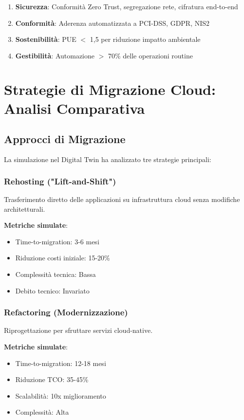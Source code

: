 \begin{enumerate}
\item \textbf{Sicurezza}: Conformità Zero Trust, segregazione rete, cifratura end-to-end
\item \textbf{Conformità}: Aderenza automatizzata a PCI-DSS, GDPR, NIS2
\item \textbf{Sostenibilità}: PUE $<$ 1,5 per riduzione impatto ambientale
\item \textbf{Gestibilità}: Automazione $>$ 70\% delle operazioni routine
\end{enumerate}

\section{Strategie di Migrazione Cloud: Analisi Comparativa}

\subsection{Approcci di Migrazione}

La simulazione nel Digital Twin ha analizzato tre strategie principali:

\subsubsection{Rehosting ("Lift-and-Shift")}
Trasferimento diretto delle applicazioni su infrastruttura cloud senza modifiche architetturali.

\textbf{Metriche simulate}:
\begin{itemize}
\item Time-to-migration: 3-6 mesi
\item Riduzione costi iniziale: 15-20\%
\item Complessità tecnica: Bassa
\item Debito tecnico: Invariato
\end{itemize}

\subsubsection{Refactoring (Modernizzazione)}
Riprogettazione per sfruttare servizi cloud-native.

\textbf{Metriche simulate}:
\begin{itemize}
\item Time-to-migration: 12-18 mesi
\item Riduzione TCO: 35-45\%
\item Scalabilità: 10x miglioramento
\item Complessità: Alta
\end{itemize}

